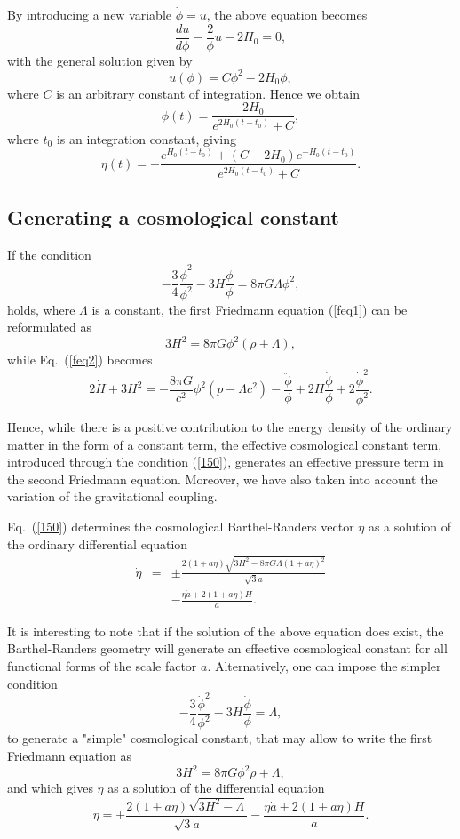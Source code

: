 \documentclass[aps,superscriptaddress, showpacs,preprintnumbers, superscriptaddress, nofootinbibt,twocolumn]{revtex4-2}
\def\be{\begin{equation}}
\def\ee{\end{equation}}
\def\bea{\begin{eqnarray}}
\def\eea{\end{eqnarray}}
\begin{document}
By introducing a new variable $\dot{\phi}=u$, the above equation becomes
\be
\frac{du}{d\phi}-\frac{2}{\phi}u-2H_0=0,
\ee
with the general solution given by
\be
u(\phi)=C\phi ^2-2H_0\phi,
\ee
where $C$ is an arbitrary constant of integration. Hence we obtain
\be
\phi(t)=\frac{2H_0}{e^{2H_0\left(t-t_0\right)}+C},
\ee
where $t_0$ is an integration constant, giving
\begin{equation}
\eta (t)=-\frac{e^{H_{0}\left( t-t_{0}\right) }+\left( C-2H_{0}\right)
e^{-H_{0}\left( t-t_{0}\right) }}{e^{2H_{0}\left( t-t_{0}\right) }+C}.
\end{equation}

\subsection{Generating a cosmological constant}

If the condition
\be\label{150}
-\frac{3}{4}\frac{\dot{\phi}^2}{\phi^2}-3H\frac{\dot{\phi}}{\phi}=8\pi G\Lambda \phi^2,
\ee
holds, where $\Lambda$ is a constant, the first Friedmann equation (\ref{feq1}) can be reformulated as
\be
3H^2=8\pi G \phi ^2 \left(\rho +\Lambda\right),
\ee
while Eq.~(\ref{feq2}) becomes
\be
2\dot{H}+3H^2=-\frac{8\pi G}{c^2}\phi ^2\left(p-\Lambda c^2\right)-\frac{\ddot{\phi}}{\phi}+2H\frac{\dot{\phi}}{\phi}+2\frac{\dot{\phi}^2}{\phi^2}.
\ee

Hence, while there is a positive contribution to the energy density of the ordinary matter in the form of a constant term, the effective cosmological constant term, introduced through the condition (\ref{150}), generates an effective pressure term in the second Friedmann equation. Moreover, we have also taken into account the variation of the gravitational coupling.

Eq.~(\ref{150}) determines the cosmological Barthel-Randers vector $\eta$ as a solution of the ordinary differential equation
\bea
\dot{\eta} &=&\pm\frac{2 (1+a \eta ) \sqrt{3 H^2-8\pi G\Lambda  (1+a \eta )^2}}{\sqrt{3}
   a}\nonumber\\
  && -\frac{\eta  \dot{a}+2  (1+a \eta)H}{a}.
\eea

It is interesting to note that if the solution of the above equation does exist, the Barthel-Randers geometry will generate an effective cosmological constant for all functional forms of the scale factor $a$. Alternatively, one can impose the simpler condition
\be\label{150a}
-\frac{3}{4}\frac{\dot{\phi}^2}{\phi^2}-3H\frac{\dot{\phi}}{\phi}=\Lambda,
\ee
to generate a "simple" cosmological constant, that may allow to write the first Friedmann equation as
\be
3H^2=8\pi G\phi^2 \rho+\Lambda,
\ee
and which gives $\eta$ as a solution of the differential equation
\be\label{150b}
\dot{\eta} =\pm\frac{2 (1+a \eta ) \sqrt{3 H^2-\Lambda  }}{\sqrt{3}
   a}-\frac{\eta  \dot{a}+2  (1+a \eta)H}{a}.
\ee
\end{document}
